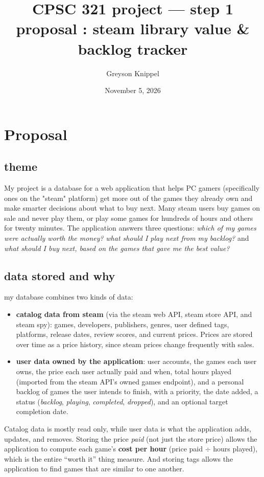 \documentclass[11pt]{article}
\title{\vspace{-2em}CPSC 321 project --- step 1\\[0.3em]
\large proposal : steam library value \& backlog tracker}
\author{Greyson Knippel}
\date{November 5, 2026}
\begin{document}
\maketitle
\vspace{-2.2em}

\section{Proposal}

\subsection{theme}
My project is a database for a web application that helps PC gamers (specifically ones on the "steam" platform) get more out
of the games they already own and make smarter decisions about what to buy next.
Many steam users buy games on sale and never play them, or play some games for
hundreds of hours and others for twenty minutes. The application answers three
questions: \emph{which of my games were actually worth the money?} \emph{what
should I play next from my backlog?} and \emph{what should I buy next, based on the
games that gave me the best value?}

\subsection{data stored and why}
my database combines two kinds of data:
\begin{itemize}
  \item \textbf{catalog data from steam} (via the steam web API, steam store API,
        and steam spy): games, developers, publishers, genres, user defined tags,
        platforms, release dates, review scores, and current prices. Prices are
        stored over time as a price history, since steam prices change frequently
        with sales.
  \item \textbf{user data owned by the application}: user accounts, the games each
        user owns, the price each user actually paid and when, total hours played
        (imported from the steam API's owned games endpoint), and a personal
        backlog of games the user intends to finish, with a priority, the date
        added, a status (\textit{backlog}, \textit{playing}, \textit{completed},
        \textit{dropped}), and an optional target completion date.
\end{itemize}
Catalog data is mostly read only, while user data
is what the application adds, updates, and removes. Storing the price \emph{paid}
(not just the store price) allows the application to compute each game's
\textbf{cost per hour} (price paid $\div$ hours played), which is the entire
``worth it'' thing measure. And storing tags allows the application to find games that are
similar to one another.
\end{document}

